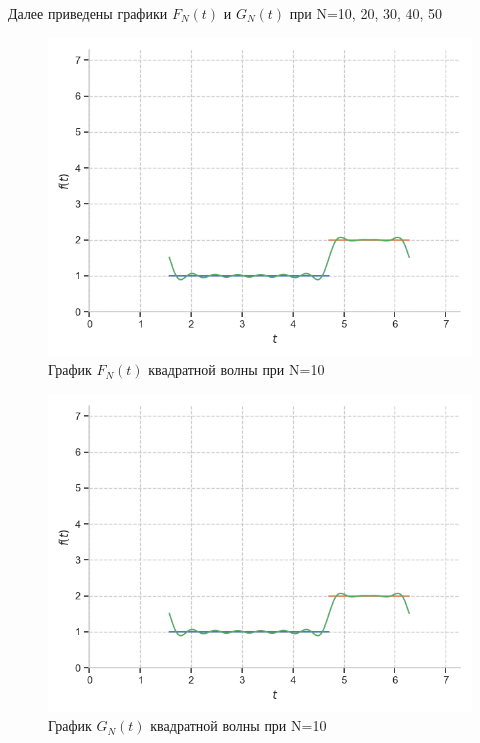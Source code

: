 \documentclass[a4paper, 16pt]{article}
\begin{document}
\noindent Далее приведены графики $F_N(t)$ и $G_N(t)$ при N=10, 20, 30, 40, 50


\newpage
\vspace*{10mm}
\begin{figure}[!htb]
    \centering
    \includegraphics[scale=0.8]{fur_sqwave_n=10.png}
    \captionsetup{skip=0pt}
    \caption{График $F_N(t)$ квадратной волны при N=10}
    \label{Рис:2}
\end{figure}
\begin{figure}[!htb]
    \centering
    \includegraphics[scale=0.8]{cfur_sqwave_n=10.png}
    \captionsetup{skip=0pt}
    \caption{График $G_N(t)$ квадратной волны при N=10}
    \label{Рис:3}
\end{figure}
\end{document}
